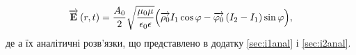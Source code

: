%
\begin{equation} \label{eq:linear_e_cyl}
\overrightarrow{\mathbf E} \left( r, t \right) = \frac{A_0}{2} 
\sqrt{\frac{\mu_0 \mu}{\epsilon_0 \epsilon}}
\Big( \overrightarrow{\mathbf \rho_0} I_1 \cos \varphi - 
\overrightarrow{\mathbf  \varphi_0 } \left( I_2 - I_1 \right) \sin \varphi \Big),
\end{equation}
%
де
%
%
%
а їх аналітичні розв'язки, що представлено в додатку \ref{sec:i1anal} і 
\ref{sec:i2anal}.


